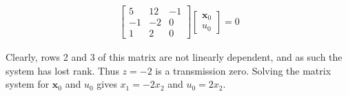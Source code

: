 \documentclass[]{article}
\begin{document}
\begin{align*}
	\begin{bmatrix}
	5 & 12 & -1 \\
	-1 & -2 & 0 \\
	1 & 2 & 0
	\end{bmatrix}
	\begin{bmatrix}
	\mathbf{x}_0 \\
	u_0
	\end{bmatrix} = 0
\end{align*}

Clearly, rows 2 and 3 of this matrix are not linearly dependent, and as such the system has lost rank.
Thus $z=-2$ is a transmission zero.
Solving the matrix system for $\mathbf{x}_0$ and $u_0$ gives $x_1 = -2x_2$ and $u_0 = 2x_2$.
\end{document}
